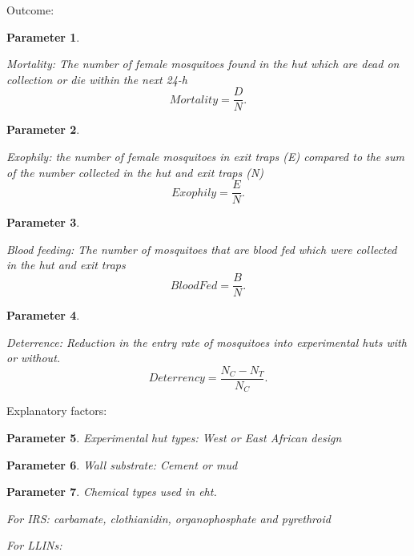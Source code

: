 \documentclass[a4paper, 12pt, twoside]{article}
\newtheorem{parameter}{Parameter}
\begin{document}
Outcome:

\begin{parameter}
	\label{eht:mortality}

	Mortality: The number of female mosquitoes found in the hut which are dead on collection or die within the next 24-h
	\[
		Mortality = \frac{D}{N}
		.\]
\end{parameter}


\begin{parameter}
	\label{eht:exophily}

	Exophily: the number of female mosquitoes in exit traps (E) compared to the sum of the number collected in the hut and exit traps (N)
	\[
		Exophily = \frac{E}{N}
		.\]

\end{parameter}

\begin{parameter}
	\label{eht:blood_fed}

	Blood feeding: The number of mosquitoes that are blood fed which were collected in the hut and exit traps
	\[
		BloodFed = \frac{B}{N}
		.\]
\end{parameter}

\begin{parameter}
	\label{eht:Deterrence}

	Deterrence: Reduction in the entry rate of mosquitoes into experimental huts with or without.
	\[
		Deterrency = \frac{N_C - N_T}{N_C}
		.\]
\end{parameter}

Explanatory factors:

\begin{parameter}
	\label{eht:experimental_hut_types}
	Experimental hut types: West or East African design

\end{parameter}

\begin{parameter}
	\label{eht:wall_substrate} Wall substrate: Cement or mud

\end{parameter}

\begin{parameter}
	\label{eht:chemical_class_used}
	Chemical types used in \gls{eht}.

	For IRS: carbamate, clothianidin, organophosphate and pyrethroid

	For LLINs:

\end{parameter}
\end{document}
